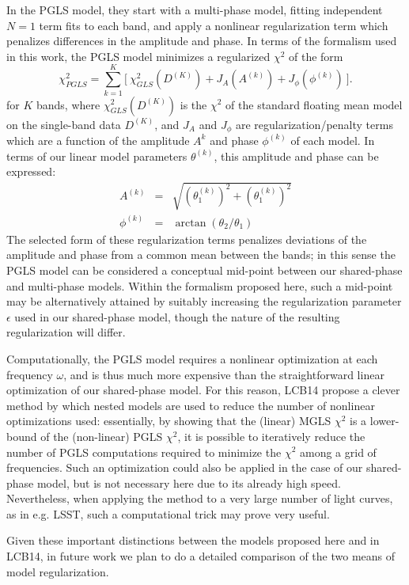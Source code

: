\documentclass[12pt,preprint]{aastex}
\begin{document}
In the PGLS model, they start with a multi-phase model, fitting independent $N=1$ term fits to each band, and apply a nonlinear regularization term which penalizes differences in the amplitude and phase. In terms of the formalism used in this work, the PGLS model minimizes a regularized $\chi^2$ of the form
\begin{equation}
  \chi^2_{PGLS} = \sum_{k=1}^K \bigg[~\chi^2_{GLS}(D^{(K)}) + J_A(A^{(k)}) + J_\phi(\phi^{(k)})~\bigg].
\end{equation}
for $K$ bands, where $\chi^2_{GLS}(D^{(K)})$ is the $\chi^2$ of the standard floating mean model on the single-band data $D^{(K)}$, and $J_A$ and $J_\phi$ are regularization/penalty terms which are a function of the amplitude $A^{k}$ and phase $\phi^{(k)}$ of each model. In terms of our linear model parameters $\theta^{(k)}$, this amplitude and phase can be expressed:
\begin{eqnarray}
 A^{(k)} &=& \sqrt{(\theta_1^{(k)})^2 + (\theta_1^{(k)})^2}\nonumber\\
 \phi^{(k)} &=& \arctan(\theta_2 / \theta_1)
\end{eqnarray}
The selected form of these regularization terms penalizes deviations of the amplitude and phase from a common mean between the bands; in this sense the PGLS model can be considered a conceptual mid-point between our shared-phase and multi-phase models. Within the formalism proposed here, such a mid-point may be alternatively attained by suitably increasing the regularization parameter $\epsilon$ used in our shared-phase model, though the nature of the resulting regularization will differ.

Computationally, the PGLS model requires a nonlinear optimization at each frequency $\omega$, and is thus much more expensive than the straightforward linear optimization of our shared-phase model.
For this reason, LCB14 propose a clever method by which nested models are used to reduce the number of nonlinear optimizations used: essentially, by showing that the (linear) MGLS $\chi^2$ is a lower-bound of the (non-linear) PGLS $\chi^2$, it is possible to iteratively reduce the number of PGLS computations required to minimize the $\chi^2$ among a grid of frequencies.
Such an optimization could also be applied in the case of our shared-phase model, but is not necessary here due to its already high speed.
Nevertheless, when applying the method to a very large number of light curves, as in e.g. LSST, such a computational trick may prove very useful.

Given these important distinctions between the models proposed here and in LCB14, in future work we plan to do a detailed comparison of the two means of model regularization.
\end{document}
